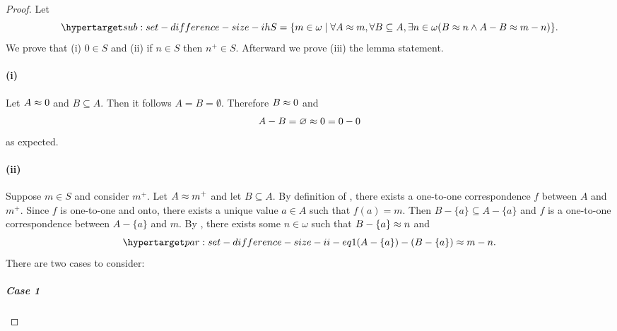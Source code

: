 \documentclass{report}
\begin{document}
  \begin{proof}

    Let
      \begin{equation}
        \hyperlabel{sub:set-difference-size-ih}
        S = \{m \in \omega \mid
          \forall A \equin m, \forall B \subseteq A, \exists n
            \in \omega (B \equin n \land A - B \equin m - n)\}.
      \end{equation}
    We prove that (i) $0 \in S$ and (ii) if $n \in S$ then $n^+ \in S$.
    Afterward we prove (iii) the lemma statement.

    \paragraph{(i)}%

      Let $A \approx 0$ and $B \subseteq A$.
      Then it follows $A = B = \emptyset$.
      Therefore $B \approx 0$ and $$A - B = \varnothing \approx 0 = 0 - 0$$ as
        expected.

    \paragraph{(ii)}%

      Suppose $m \in S$ and consider $m^+$.
      Let $A \approx m^+$ and let $B \subseteq A$.
      By definition of , there exists a one-to-one
        correspondence $f$ between $A$ and $m^+$.
      Since $f$ is one-to-one and onto, there exists a unique value $a \in A$
        such that $f(a) = m$.
      Then $B - \{a\} \subseteq A - \{a\}$ and $f$ is a one-to-one
        correspondence between $A - \{a\}$ and $m$.
      By , there exists some $n \in \omega$
        such that $B - \{a\} \approx n$ and
        \begin{equation}
          \hyperlabel{par:set-difference-size-ii-eq1}
          (A - \{a\}) - (B - \{a\}) \equin m - n.
        \end{equation}
      There are two cases to consider:

      \subparagraph{Case 1}%


\end{proof}
\end{document}
